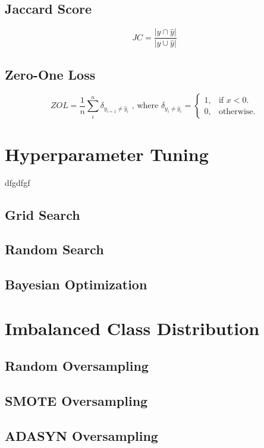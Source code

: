 \subsection{Jaccard Score}


\begin{equation}\label{eq}
    JC = \frac{|y \cap \hat{y} |}{|y \cup \hat{y} |}
    \end{equation}


\subsection{Zero-One Loss}

\begin{equation}\label{eq}
    ZOL = \frac{1}{n} \sum_{i}^{n} \delta_{y_{i=1} \neq \hat{y}_{i}} \text{ , where } \delta_{y_{i} \neq \hat{y}_{i}} = \begin{cases}
        1, & \text{if $x<0$}.\\
        0, & \text{otherwise}.
      \end{cases}
\end{equation}
\section{Hyperparameter Tuning}

dfgdfgf

\subsection{Grid Search}
\subsection{Random Search}
\subsection{Bayesian Optimization}
\section{Imbalanced Class Distribution}
\subsection{Random Oversampling}
\subsection{SMOTE Oversampling}
\subsection{ADASYN Oversampling}

